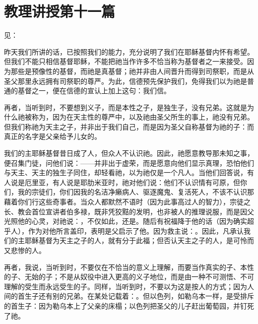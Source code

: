 \section{教理讲授第十一篇}

\par

见：\par

\par

昨天我们所讲的话，已按照我们的能力，充分说明了我们在耶稣基督内怀有希望。但我们不能只相信基督耶稣，不能把祂当作许多不恰当称为基督者之一来接受。因为那些是预像性的基督，而祂是真基督；祂并非由人间晋升而得到司祭职，而是从圣父那里永远拥有司祭职的尊严。为此，信德预先保护我们，免得我们以为祂是普通的基督之一，便在信德的宣认上加上这句：我们信。\par

再者，当听到时，不要想到义子，而是本性之子，是独生子，没有兄弟。这就是为什么祂被称为，因为在天主性的尊严中，以及祂由圣父所生的事上，祂没有兄弟。但我们称祂为天主之子，并非出于我们自己，而是因为圣父自称基督为祂的子：而真正的名字是父亲给予儿女的。\par

我们的主耶稣基督昔日成了人，但众人不认识祂。因此，祂愿意教导那未知之事，便召集门徒，问他们说：——并非出于虚荣，而是愿意向他们显示真理，恐怕他们与天主、天主的独生子同住，却轻看祂，以为祂仅是一个凡人。当他们回答说，有人说是厄里亚，有人说是耶肋米亚时，祂对他们说：他们不认识情有可原，但你们，我的宗徒们，你们因我的名洁净癞病人、驱逐魔鬼、复活死人，不该不认识那藉着你们行这些奇事者。当众人都默然不语时（因为此事高过人的智力），宗徒之长、教会首位宣讲者伯多禄，既非凭狡黠的发明，也非被人的推理说服，而是因父光照他的心灵，对祂说：，不仅如此，还是。随后有祝福降于他的话（因为确实超乎人），作为对他所言盖印，表明是父启示了他。因为救主说：。因此，凡承认我们的主耶稣基督为天主之子的人，就有分于此福；但否认天主之子的人，是可怜而又悲惨的人。\par

再者，我说，当听到时，不要仅在不恰当的意义上理解，而要当作真实的子、本性的子、无始的子；不是从奴役中进入更高的义子地位，而是由一种不可测悟、不可理解的受生而永远受生的子。同样，当听到时，不要以为这是按人的方式；因为人间的首生子还有别的兄弟。在某处记载着：。但以色列，如勒乌本一样，是受排斥的首生子：因为勒乌本上了父亲的床榻；以色列把圣父的儿子赶出葡萄园，并钉死了祂。\par

